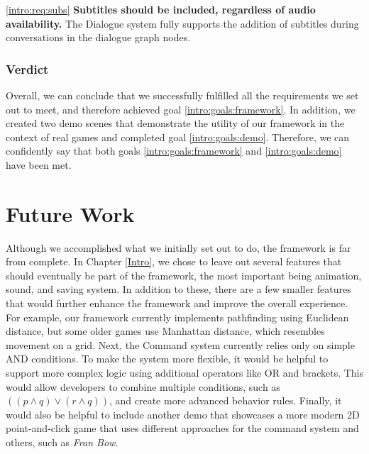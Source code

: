 \ref{intro:req:subs} \quad  \textbf{Subtitles should be included, regardless of audio availability.} The Dialogue system fully supports the addition of subtitles during conversations in the dialogue graph nodes.

\subsubsection{Verdict}
Overall, we can conclude that we successfully fulfilled all the requirements we set out to meet, and therefore achieved goal \ref{intro:goals:framework}. In addition, we created two demo scenes that demonstrate the utility of our framework in the context of real games and completed goal \ref{intro:goals:demo}. Therefore, we can confidently say that both goals \ref{intro:goals:framework} and \ref{intro:goals:demo} have been met.

\section{Future Work}
Although we accomplished what we initially set out to do, the framework is far from complete. In Chapter \ref{Intro}, we chose to leave out several features that should eventually be part of the framework, the most important being animation, sound, and saving system. In addition to these, there are a few smaller features that would further enhance the framework and improve the overall experience. For example, our framework currently implements pathfinding using Euclidean distance, but some older games use Manhattan distance, which resembles movement on a grid. Next, the Command system currently relies only on simple AND conditions. To make the system more flexible, it would be helpful to support more complex logic using additional operators like OR and brackets. This would allow developers to combine multiple conditions, such as $((p \wedge q) \vee (r \wedge q))$, and create more advanced behavior rules.  Finally, it would also be helpful to include another demo that showcases a more modern 2D point-and-click game that uses different approaches for the command system and others, such as \textit{Fran Bow}. 